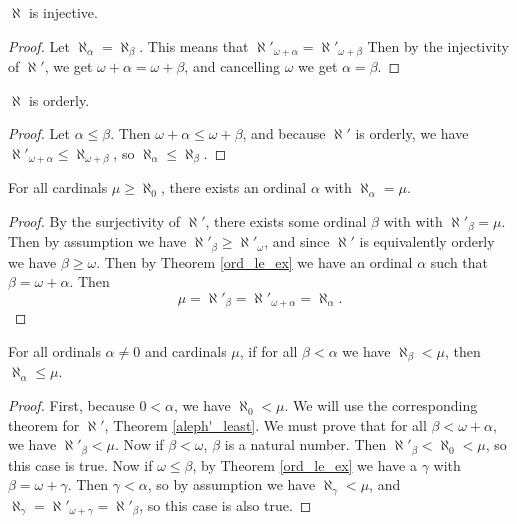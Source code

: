 \documentclass[../../math.tex]{subfiles}
\begin{document}
\begin{instance}
    $\aleph$ is injective.
\end{instance}
\begin{proof}
    Let $\aleph_\alpha = \aleph_\beta$.  This means that $\aleph'_{\omega +
    \alpha} = \aleph'_{\omega + \beta}$  Then by the injectivity of $\aleph'$,
    we get $\omega + \alpha = \omega + \beta$, and cancelling $\omega$ we get
    $\alpha = \beta$.
\end{proof}

\begin{instance}
    $\aleph$ is orderly.
\end{instance}
\begin{proof}
    Let $\alpha \leq \beta$.  Then $\omega + \alpha \leq \omega + \beta$, and
    because $\aleph'$ is orderly, we have $\aleph'_{\omega + \alpha} \leq
    \aleph_{\omega + \beta}$, so $\aleph_\alpha \leq \aleph_\beta$.
\end{proof}

\begin{theorem} \label{aleph_sur}
    For all cardinals $\mu \geq \aleph_0$, there exists an ordinal $\alpha$ with
    $\aleph_\alpha = \mu$.
\end{theorem}
\begin{proof}
    By the surjectivity of $\aleph'$, there exists some ordinal $\beta$ with
    with $\aleph'_\beta = \mu$.  Then by assumption we have $\aleph'_\beta \geq
    \aleph'_\omega$, and since $\aleph'$ is equivalently orderly we have $\beta
    \geq \omega$.  Then by Theorem \ref{ord_le_ex} we have an ordinal $\alpha$
    such that $\beta = \omega + \alpha$.  Then
    \[
        \mu = \aleph'_\beta = \aleph'_{\omega + \alpha} = \aleph_\alpha.
    \]
\end{proof}

\begin{theorem} \label{aleph_least}
    For all ordinals $\alpha \neq 0$ and cardinals $\mu$, if for all $\beta <
    \alpha$ we have $\aleph_\beta < \mu$, then $\aleph_\alpha \leq \mu$.
\end{theorem}
\begin{proof}
    First, because $0 < \alpha$, we have $\aleph_0 < \mu$.
    We will use the corresponding theorem for $\aleph'$, Theorem
    \ref{aleph'_least}.  We must prove that for all $\beta < \omega + \alpha$,
    we have $\aleph'_\beta < \mu$.  Now if $\beta < \omega$, $\beta$ is a
    natural number.  Then $\aleph'_\beta < \aleph_0 < \mu$, so this case is
    true.  Now if $\omega \leq \beta$, by Theorem \ref{ord_le_ex} we have a
    $\gamma$ with $\beta = \omega + \gamma$.  Then $\gamma < \alpha$, so by
    assumption we have $\aleph_\gamma < \mu$, and $\aleph_\gamma =
    \aleph'_{\omega + \gamma} = \aleph'_\beta$, so this case is also true.
\end{proof}
\end{document}
